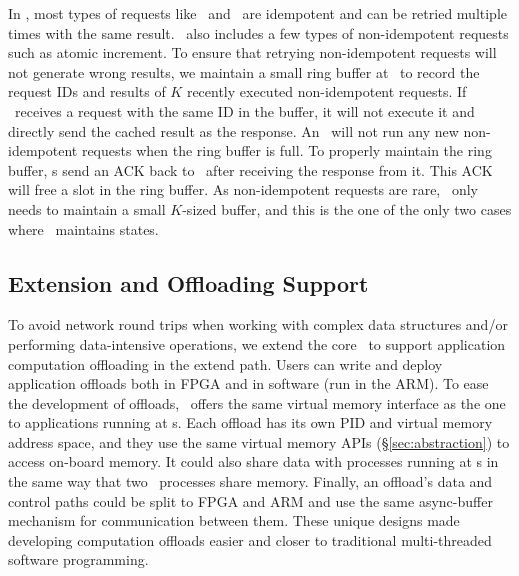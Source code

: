 In \sys, most types of requests like \sysread\ and \syswrite\ are idempotent and can be retried multiple times with the same result.
\sys\ also includes a few types of non-idempotent requests such as atomic increment.
To ensure that retrying non-idempotent requests will not generate wrong results, we maintain a small ring buffer at \MN\ to record the request IDs and results of $K$ recently executed non-idempotent requests.
If \MN\ receives a request with the same ID in the buffer, it will not execute it and directly send the cached result as the response.
An \MN\ will not run any new non-idempotent requests when the ring buffer is full. To properly maintain the ring buffer, \CN{}s send an ACK back to \MN\ after receiving the response from it. This ACK will free a slot in the ring buffer.
As non-idempotent requests are rare, \MN\ only needs to maintain a small $K$-sized buffer, and this is the one of the only two cases where \MN\ maintains states.
\fi

\subsection{Extension and Offloading Support}
\label{sec:extended}
To avoid network round trips when working with complex data structures and/or performing data-intensive operations,
we extend the core \MN\ to support application computation offloading in the extend path.
Users can write and deploy application offloads both in FPGA and in software (run in the ARM).
To ease the development of offloads, \sys\ offers the same virtual memory interface as the one to applications running at \CN{}s.
Each offload has its own PID and virtual memory address space, and they use the same virtual memory APIs (\S\ref{sec:abstraction}) to access on-board memory. It could also share data with processes running at \CN{}s in the same way that two \CN\ processes share memory.
Finally, an offload’s data and control paths could be split to FPGA and ARM and use the same async-buffer mechanism for communication between them. 
These unique designs made developing computation offloads easier and closer to traditional multi-threaded software programming.


